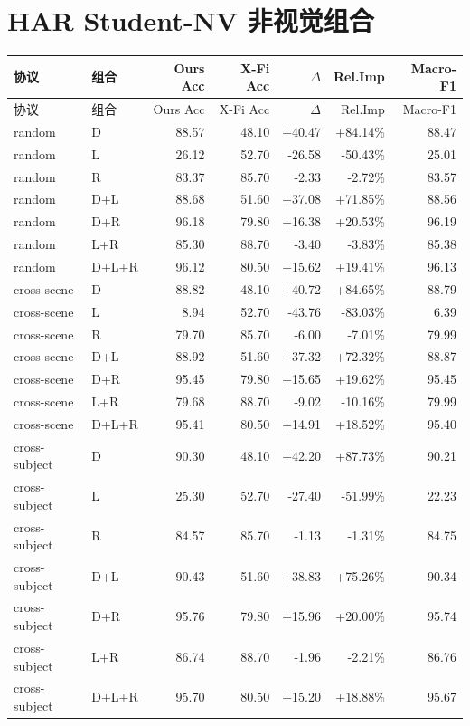 \documentclass[UTF8,10pt,a4paper]{ctexart}
\newcommand{\better}[1]{\textcolor{ImpBlue}{#1}}
\newcommand{\worse}[1]{\textcolor{DropRed}{#1}}
\begin{document}
\section{HAR Student-NV 非视觉组合}
{\tiny
\begin{longtable}{llrrrrr}
\toprule
协议 & 组合 & Ours Acc & X-Fi Acc & $\Delta$ & Rel.Imp & Macro-F1\\
\midrule
\endfirsthead
\toprule
协议 & 组合 & Ours Acc & X-Fi Acc & $\Delta$ & Rel.Imp & Macro-F1\\
\midrule
\endhead
random & D & 88.57 & 48.10 & \better{+40.47} & \better{+84.14\%} & 88.47\\
random & L & 26.12 & 52.70 & \worse{-26.58} & \worse{-50.43\%} & 25.01\\
random & R & 83.37 & 85.70 & \worse{-2.33} & \worse{-2.72\%} & 83.57\\
random & D+L & 88.68 & 51.60 & \better{+37.08} & \better{+71.85\%} & 88.56\\
random & D+R & 96.18 & 79.80 & \better{+16.38} & \better{+20.53\%} & 96.19\\
random & L+R & 85.30 & 88.70 & \worse{-3.40} & \worse{-3.83\%} & 85.38\\
random & D+L+R & 96.12 & 80.50 & \better{+15.62} & \better{+19.41\%} & 96.13\\
cross-scene & D & 88.82 & 48.10 & \better{+40.72} & \better{+84.65\%} & 88.79\\
cross-scene & L & 8.94 & 52.70 & \worse{-43.76} & \worse{-83.03\%} & 6.39\\
cross-scene & R & 79.70 & 85.70 & \worse{-6.00} & \worse{-7.01\%} & 79.99\\
cross-scene & D+L & 88.92 & 51.60 & \better{+37.32} & \better{+72.32\%} & 88.87\\
cross-scene & D+R & 95.45 & 79.80 & \better{+15.65} & \better{+19.62\%} & 95.45\\
cross-scene & L+R & 79.68 & 88.70 & \worse{-9.02} & \worse{-10.16\%} & 79.99\\
cross-scene & D+L+R & 95.41 & 80.50 & \better{+14.91} & \better{+18.52\%} & 95.40\\
cross-subject & D & 90.30 & 48.10 & \better{+42.20} & \better{+87.73\%} & 90.21\\
cross-subject & L & 25.30 & 52.70 & \worse{-27.40} & \worse{-51.99\%} & 22.23\\
cross-subject & R & 84.57 & 85.70 & \worse{-1.13} & \worse{-1.31\%} & 84.75\\
cross-subject & D+L & 90.43 & 51.60 & \better{+38.83} & \better{+75.26\%} & 90.34\\
cross-subject & D+R & 95.76 & 79.80 & \better{+15.96} & \better{+20.00\%} & 95.74\\
cross-subject & L+R & 86.74 & 88.70 & \worse{-1.96} & \worse{-2.21\%} & 86.76\\
cross-subject & D+L+R & 95.70 & 80.50 & \better{+15.20} & \better{+18.88\%} & 95.67\\
\bottomrule
\end{longtable}
}
\end{document}
